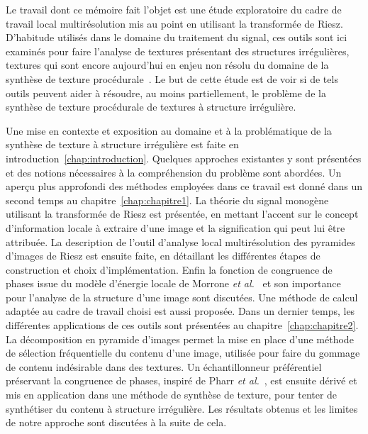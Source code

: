 \Conclusion \label{chap:conclusion}


Le travail dont ce mémoire fait l'objet est une étude exploratoire du cadre de travail local multirésolution mis au point en utilisant la transformée de Riesz. D'habitude utilisés dans le domaine du traitement du signal, ces outils sont ici examinés pour faire l'analyse de textures présentant des structures irrégulières, textures qui sont encore aujourd'hui en enjeu non résolu du domaine de la synthèse de texture procédurale~\cite{guehl_semi-procedural_2020}. Le but de cette étude est de voir si de tels outils peuvent aider à résoudre, au moins partiellement, le problème de la synthèse de texture procédurale de textures à structure irrégulière.

\bigskip

Une mise en contexte et exposition au domaine et à la problématique de la synthèse de texture à structure irrégulière est faite en introduction~\ref{chap:introduction}. Quelques approches existantes y sont présentées et des notions nécessaires à la compréhension du problème sont abordées. Un aperçu plus approfondi des méthodes employées dans ce travail est donné dans un second temps au chapitre~\ref{chap:chapitre1}. La théorie du signal monogène utilisant la transformée de Riesz est présentée, en mettant l'accent sur le concept d'information locale à extraire d'une image et la signification qui peut lui être attribuée. La description de l'outil d'analyse local multirésolution des pyramides d'images de Riesz est ensuite faite, en détaillant les différentes étapes de construction et choix d'implémentation. Enfin la fonction de congruence de phases issue du modèle d'énergie locale de Morrone \textit{et al.}~\cite{morrone_feature_1987, morrone_mach_1986} et son importance pour l'analyse de la structure d'une image sont discutées. Une méthode de calcul adaptée au cadre de travail choisi est aussi proposée. Dans un dernier temps, les différentes applications de ces outils sont présentées au chapitre~\ref{chap:chapitre2}. La décomposition en pyramide d'images permet la mise en place d'une méthode de sélection fréquentielle du contenu d'une image, utilisée pour faire du gommage de contenu indésirable dans des textures. Un échantillonneur préférentiel préservant la congruence de phases, inspiré de Pharr \textit{et al.}~\cite{pharr_physically_2023}, est ensuite dérivé et mis en application dans une méthode de synthèse de texture, pour tenter de synthétiser du contenu à structure irrégulière. Les résultats obtenus et les limites de notre approche sont discutées à la suite de cela.

